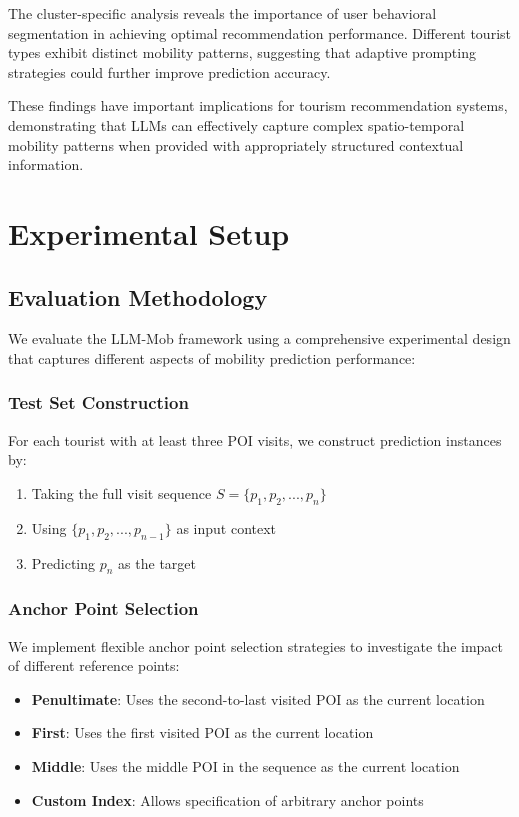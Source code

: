 \documentclass[12pt,a4paper]{article}
\begin{document}
The cluster-specific analysis reveals the importance of user behavioral segmentation in achieving optimal recommendation performance. Different tourist types exhibit distinct mobility patterns, suggesting that adaptive prompting strategies could further improve prediction accuracy.

These findings have important implications for tourism recommendation systems, demonstrating that LLMs can effectively capture complex spatio-temporal mobility patterns when provided with appropriately structured contextual information.

\section{Experimental Setup}

\subsection{Evaluation Methodology}

We evaluate the LLM-Mob framework using a comprehensive experimental design that captures different aspects of mobility prediction performance:

\subsubsection{Test Set Construction}
For each tourist with at least three POI visits, we construct prediction instances by:
\begin{enumerate}
\item Taking the full visit sequence $S = \{p_1, p_2, ..., p_n\}$
\item Using $\{p_1, p_2, ..., p_{n-1}\}$ as input context
\item Predicting $p_n$ as the target
\end{enumerate}

\subsubsection{Anchor Point Selection}
We implement flexible anchor point selection strategies to investigate the impact of different reference points:
\begin{itemize}
\item \textbf{Penultimate}: Uses the second-to-last visited POI as the current location
\item \textbf{First}: Uses the first visited POI as the current location
\item \textbf{Middle}: Uses the middle POI in the sequence as the current location
\item \textbf{Custom Index}: Allows specification of arbitrary anchor points
\end{itemize}
\end{document}
